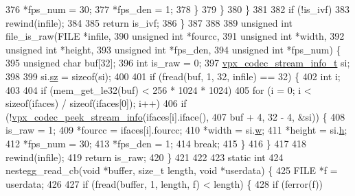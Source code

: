 \begin{DoxyCodeInclude}
{{{{{{{{{376         *fps\_num = 30;
377         *fps\_den = 1;
378       \}
379     \}
380   \}
381 
382   \textcolor{keywordflow}{if} (!is\_ivf)
383     rewind(infile);
384 
385   \textcolor{keywordflow}{return} is\_ivf;
386 \}
387 
388 
389 \textcolor{keywordtype}{unsigned} \textcolor{keywordtype}{int} file\_is\_raw(FILE *infile,
390                          \textcolor{keywordtype}{unsigned} \textcolor{keywordtype}{int} *fourcc,
391                          \textcolor{keywordtype}{unsigned} \textcolor{keywordtype}{int} *width,
392                          \textcolor{keywordtype}{unsigned} \textcolor{keywordtype}{int} *height,
393                          \textcolor{keywordtype}{unsigned} \textcolor{keywordtype}{int} *fps\_den,
394                          \textcolor{keywordtype}{unsigned} \textcolor{keywordtype}{int} *fps\_num) \{
395   \textcolor{keywordtype}{unsigned} \textcolor{keywordtype}{char} buf[32];
396   \textcolor{keywordtype}{int} is\_raw = 0;
397   \hyperlink{structvpx__codec__stream__info}{vpx\_codec\_stream\_info\_t} si;
398 
399   si.\hyperlink{structvpx__codec__stream__info_a8e5eb38a9042da54a20607f71591ddbf}{sz} = \textcolor{keyword}{sizeof}(si);
400 
401   \textcolor{keywordflow}{if} (fread(buf, 1, 32, infile) == 32) \{
402     \textcolor{keywordtype}{int} i;
403 
404     \textcolor{keywordflow}{if} (mem\_get\_le32(buf) < 256 * 1024 * 1024)
405       \textcolor{keywordflow}{for} (i = 0; i < \textcolor{keyword}{sizeof}(ifaces) / \textcolor{keyword}{sizeof}(ifaces[0]); i++)
406         \textcolor{keywordflow}{if} (!\hyperlink{group__decoder_gadfee4664d644175d5aac1465ef11c4b0}{vpx\_codec\_peek\_stream\_info}(ifaces[i].iface(),
407                                         buf + 4, 32 - 4, &si)) \{
408           is\_raw = 1;
409           *fourcc = ifaces[i].fourcc;
410           *width = si.\hyperlink{structvpx__codec__stream__info_a957dbfa83c93d9b3dc08498a6b97c77d}{w};
411           *height = si.\hyperlink{structvpx__codec__stream__info_af7a8b114547e434d182c722bdace63a0}{h};
412           *fps\_num = 30;
413           *fps\_den = 1;
414           \textcolor{keywordflow}{break};
415         \}
416   \}
417 
418   rewind(infile);
419   \textcolor{keywordflow}{return} is\_raw;
420 \}
421 
422 
423 \textcolor{keyword}{static} \textcolor{keywordtype}{int}
424 nestegg\_read\_cb(\textcolor{keywordtype}{void} *buffer, \textcolor{keywordtype}{size\_t} length, \textcolor{keywordtype}{void} *userdata) \{
425   FILE *f = userdata;
426 
427   \textcolor{keywordflow}{if} (fread(buffer, 1, length, f) < length) \{
428     \textcolor{keywordflow}{if} (ferror(f))
}}}}}}}}}
\end{DoxyCodeInclude}
